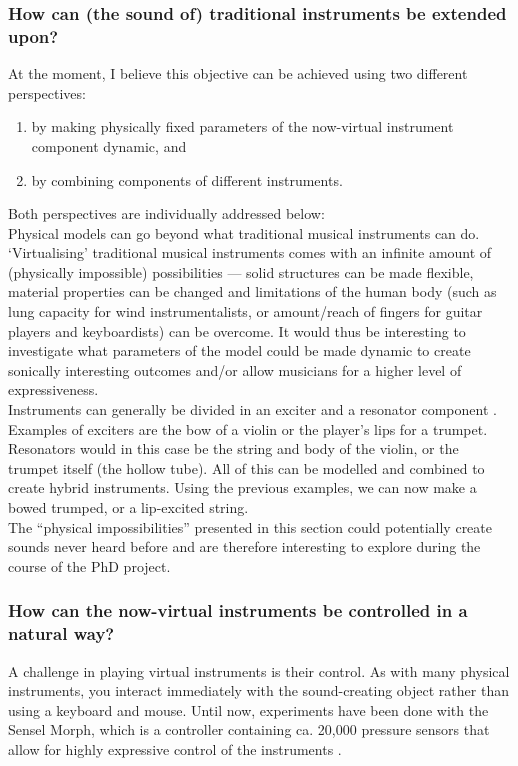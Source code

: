 \subsubsection*{How can (the sound of) traditional instruments be extended upon?}
At the moment, I believe this objective can be achieved using two different perspectives: 
\begin{enumerate}
    \item by making physically fixed parameters of the now-virtual instrument component dynamic, and
    \item by combining components of different instruments.
\end{enumerate}
Both perspectives are individually addressed below:
\\

\noindent Physical models can go beyond what traditional musical instruments can do. ‘Virtualising’ traditional musical instruments comes with an infinite amount of (physically impossible) possibilities — solid structures can be made flexible, material properties can be changed and limitations of the human body (such as lung capacity for wind instrumentalists, or amount/reach of fingers for guitar players and keyboardists) can be overcome. It would thus be interesting to investigate what parameters of the model could be made dynamic to create sonically interesting outcomes and/or allow musicians for a higher level of expressiveness.
\\

\noindent Instruments can generally be divided in an exciter and a resonator component \cite{Borin1989}. Examples of exciters are the bow of a violin or the player's lips for a trumpet. Resonators would in this case be the string and body of the violin, or the trumpet itself (the hollow tube). All of this can be modelled and combined to create hybrid instruments. Using the previous examples, we can now make a bowed trumped, or a lip-excited string.
\\

\noindent The ``physical impossibilities'' presented in this section could potentially create sounds never heard before and are therefore interesting to explore during the course of the PhD project. 

\subsubsection*{How can the now-virtual instruments be controlled in a natural way?}
A challenge in playing virtual instruments is their control. As with many physical instruments, you interact immediately with the sound-creating object rather than using a keyboard and mouse. Until now, experiments have been done with the Sensel Morph, which is a controller containing ca. 20,000 pressure sensors that allow for highly expressive control of the instruments \cite{Sensel2019}.

